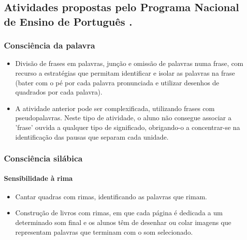 \documentclass[
  oneside,
  11pt, a4paper,
  footinclude=true,
  headinclude=true,
  cleardoublepage=empty
]{scrbook}
\begin{document}
\subsection{Atividades propostas pelo Programa Nacional de Ensino de Português \citep{Freitas}.}

\subsubsection{Consciência da palavra}
\begin{itemize}
  \item Divisão de frases em palavras, junção e omissão de palavras numa frase, com recurso a estratégias que permitam identificar e isolar as palavras na frase (bater com o pé por cada palavra pronunciada e utilizar desenhos de quadrados por cada palavra).
  \item A   atividade   anterior   pode   ser   complexificada,   utilizando   frases   com pseudopalavras. Neste tipo de atividade, o aluno não consegue associar a 'frase' ouvida a qualquer tipo de significado, obrigando-o a concentrar-se na identificação das pausas que separam cada unidade.
\end{itemize}

\subsubsection{Consciência silábica}

\paragraph{Sensibilidade à rima}
\begin{itemize}
  \item Cantar quadras com rimas, identificando as palavras que rimam.
  \item Construção de livros com rimas, em que cada página é dedicada a um determinado som final e os alunos têm de desenhar ou colar imagens que representam  palavras que terminam  com  o som selecionado.
\end{itemize}
\end{document}
